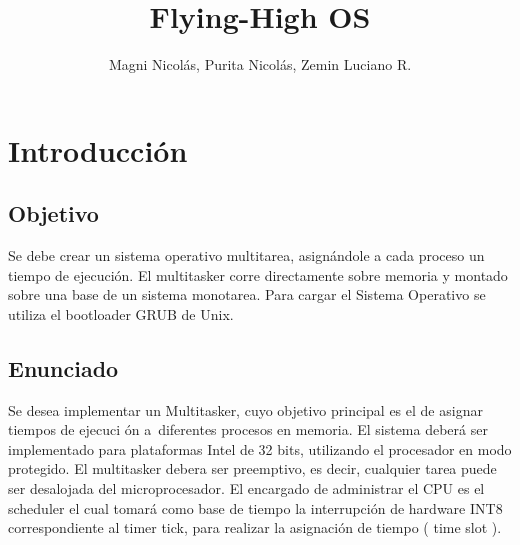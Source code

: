 \documentclass[10pt,a4paper]{article}
\author{Magni Nicol\'as, Purita Nicol\'as, Zemin Luciano R.  }
\title{Flying-High OS}
\begin{document}
\maketitle
\newpage
\tableofcontents
\clearpage

\section{Introducci\'on}
	\subsection{Objetivo}
		Se debe crear un sistema operativo multitarea, asign\'andole a cada proceso un tiempo de ejecuci\'on. El multitasker corre directamente sobre memoria y montado sobre una base de un sistema monotarea. Para cargar el Sistema Operativo se utiliza el bootloader GRUB de Unix.
	\subsection{Enunciado}
Se desea implementar un Multitasker, cuyo objetivo  principal es el de asignar tiempos de ejecuci \'on a\ diferentes procesos en memoria. El sistema deber\'a ser implementado para plataformas Intel de 32 bits, utilizando el procesador en modo protegido. El multitasker debera ser preemptivo, es decir, cualquier tarea puede ser desalojada del microprocesador. El encargado de administrar el CPU es el scheduler el cual tomar\'a como base de tiempo la interrupci\'on de hardware INT8 correspondiente al timer tick, para realizar la asignaci\'on de tiempo ( time slot ).
\end{document}
